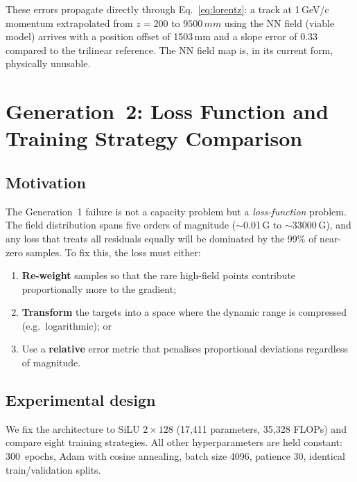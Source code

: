 \documentclass[11pt,a4paper]{article}
\newcommand{\SI}[2]{#1\,#2}
\begin{document}
These errors propagate directly through Eq.~\ref{eq:lorentz}: a track at
\SI{1}{GeV/c} momentum extrapolated from $z = 200$ to
$\SI{9500}{mm}$ using the NN field (viable model) arrives with a
position offset of \SI{1503}{mm} and a slope error of 0.33 compared to the trilinear
reference.  The NN field map is, in its current form, physically
unusable.

\section{Generation~2: Loss Function and Training Strategy Comparison}
\label{sec:gen2}

\subsection{Motivation}

The Generation~1 failure is not a capacity problem but a
\emph{loss-function} problem.  The field distribution spans five
orders of magnitude ($\sim$\SI{0.01}{G} to $\sim$\SI{33000}{G}), and
any loss that treats all residuals equally will be dominated by the
99\% of near-zero samples.  To fix this, the loss must either:
\begin{enumerate}
    \item[(a)] \textbf{Re-weight} samples so that the rare high-field
               points contribute proportionally more to the gradient;
    \item[(b)] \textbf{Transform} the targets into a space where the
               dynamic range is compressed (e.g.\ logarithmic); or
    \item[(c)] Use a \textbf{relative} error metric that penalises
               proportional deviations regardless of magnitude.
\end{enumerate}

\subsection{Experimental design}

We fix the architecture to SiLU $2 \times 128$ (17{,}411 parameters,
35{,}328 FLOPs) and compare eight training strategies.  All other
hyperparameters are held constant: 300~epochs, Adam with cosine
annealing, batch size 4096, patience 30, identical train/validation
splits.
\end{document}
